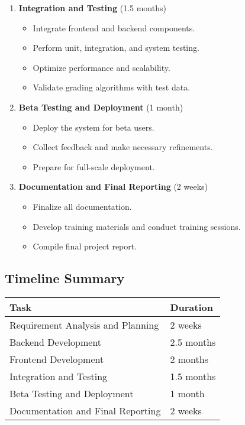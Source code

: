 \documentclass[ms,twoside,print]{nuthesis}
\begin{document}
\begin{enumerate}
    \item \textbf{Integration and Testing} (1.5 months)
    \begin{itemize}
        \item Integrate frontend and backend components.
        \item Perform unit, integration, and system testing.
        \item Optimize performance and scalability.
        \item Validate grading algorithms with test data.
    \end{itemize}
    \item \textbf{Beta Testing and Deployment} (1 month)
    \begin{itemize}
        \item Deploy the system for beta users.
        \item Collect feedback and make necessary refinements.
        \item Prepare for full-scale deployment.
    \end{itemize}
    \item \textbf{Documentation and Final Reporting} (2 weeks)
    \begin{itemize}
        \item Finalize all documentation.
        \item Develop training materials and conduct training sessions.
        \item Compile final project report.
    \end{itemize}
\end{enumerate}

\subsection{Timeline Summary}

\begin{center}
\begin{tabular}{ll}
\toprule
\textbf{Task} & \textbf{Duration} \\
\midrule
Requirement Analysis and Planning & 2 weeks \\
Backend Development & 2.5 months \\
Frontend Development & 2 months \\
Integration and Testing & 1.5 months \\
Beta Testing and Deployment & 1 month \\
Documentation and Final Reporting & 2 weeks \\
\bottomrule
\end{tabular}
\end{center}
\end{document}
